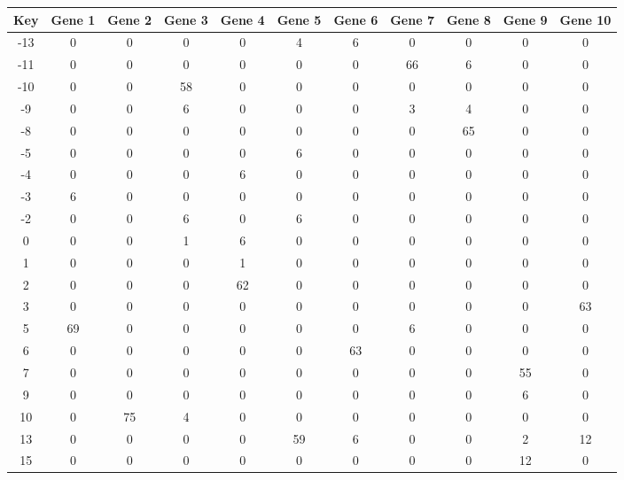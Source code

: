 \begin{tabular}{|c|c|c|c|c|c|c|c|c|c|c|}
\hline
Key & Gene 1 & Gene 2 & Gene 3 & Gene 4 & Gene 5 & Gene 6 & Gene 7 & Gene 8 & Gene 9 & Gene 10 \\
\hline
-13 & 0 & 0 & 0 & 0 & 4 & 6 & 0 & 0 & 0 & 0 \\
-11 & 0 & 0 & 0 & 0 & 0 & 0 & 66 & 6 & 0 & 0 \\
-10 & 0 & 0 & 58 & 0 & 0 & 0 & 0 & 0 & 0 & 0 \\
-9 & 0 & 0 & 6 & 0 & 0 & 0 & 3 & 4 & 0 & 0 \\
-8 & 0 & 0 & 0 & 0 & 0 & 0 & 0 & 65 & 0 & 0 \\
-5 & 0 & 0 & 0 & 0 & 6 & 0 & 0 & 0 & 0 & 0 \\
-4 & 0 & 0 & 0 & 6 & 0 & 0 & 0 & 0 & 0 & 0 \\
-3 & 6 & 0 & 0 & 0 & 0 & 0 & 0 & 0 & 0 & 0 \\
-2 & 0 & 0 & 6 & 0 & 6 & 0 & 0 & 0 & 0 & 0 \\
0 & 0 & 0 & 1 & 6 & 0 & 0 & 0 & 0 & 0 & 0 \\
1 & 0 & 0 & 0 & 1 & 0 & 0 & 0 & 0 & 0 & 0 \\
2 & 0 & 0 & 0 & 62 & 0 & 0 & 0 & 0 & 0 & 0 \\
3 & 0 & 0 & 0 & 0 & 0 & 0 & 0 & 0 & 0 & 63 \\
5 & 69 & 0 & 0 & 0 & 0 & 0 & 6 & 0 & 0 & 0 \\
6 & 0 & 0 & 0 & 0 & 0 & 63 & 0 & 0 & 0 & 0 \\
7 & 0 & 0 & 0 & 0 & 0 & 0 & 0 & 0 & 55 & 0 \\
9 & 0 & 0 & 0 & 0 & 0 & 0 & 0 & 0 & 6 & 0 \\
10 & 0 & 75 & 4 & 0 & 0 & 0 & 0 & 0 & 0 & 0 \\
13 & 0 & 0 & 0 & 0 & 59 & 6 & 0 & 0 & 2 & 12 \\
15 & 0 & 0 & 0 & 0 & 0 & 0 & 0 & 0 & 12 & 0 \\
\hline
\end{tabular}